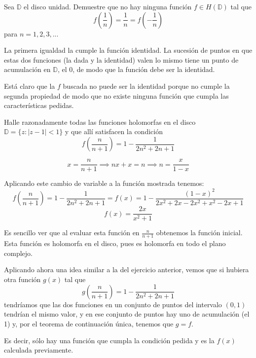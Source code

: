 \begin{problem}[1]
Sea $\mathbb{D}$ el disco unidad. Demuestre que no hay ninguna función $f \in H(\mathbb{D})$ tal que
\[f \left( \frac{1}{n}\right) = \frac{1}{n} = f\left( -\frac{1}{n} \right)\]
para $n=1,2,3,...$

\solution
La primera igualdad la cumple la función identidad. La sucesión de puntos en que estas dos funciones (la dada y la identidad) valen lo mismo tiene un punto de acumulación en $\mathbb{D}$, el 0, de modo que la función debe ser la identidad.

Está claro que la $f$ buscada no puede ser la identidad porque no cumple la segunda propiedad de modo que no existe ninguna función que cumpla las características pedidas.

\end{problem}

\begin{problem}[2]
Halle razonadamente todas las funciones holomorfas en el disco $\mathbb{D}=\{z : |z-1|<1\}$ y que allí satisfacen la condición
\[f \left( \frac{n}{n+1}\right) = 1-\frac{1}{2n^2+2n+1}\]

\solution
{}

\[x=\frac{n}{n+1} \implies nx+x=n\implies n = \frac{x}{1-x}\]

Aplicando este cambio de variable a la función mostrada tenemos:
\[f\left(\frac{n}{n+1}\right) = 1-\frac{1}{2n^2+2n+1}= f(x)=1-\frac{(1-x)^2}{2x^2+2x-2x^2+x^2-2x+1}\]
\[f(x)=\frac{2x}{x^2+1}\]

Es sencillo ver que al evaluar esta función en $\frac{n}{n+1}$ obtenemos la función inicial. Esta función es holomorfa en el disco, pues es holomorfa en todo el plano complejo.

Aplicando ahora una idea similar a la del ejercicio anterior, vemos que si hubiera otra función $g(x)$ tal que
\[g\left( \frac{n}{n+1}\right) = 1-\frac{1}{2n^2+2n+1}\]
tendríamos que las dos funciones en un conjunto de puntos del intervalo $(0,1)$ tendrían el mismo valor, y en ese conjunto de puntos hay uno de acumulación (el 1) y, por el teorema de continuación única, tenemos que $g=f$.

Es decir, sólo hay una función que cumpla la condición pedida y es la $f(x)$ calculada previamente.

\end{problem}

